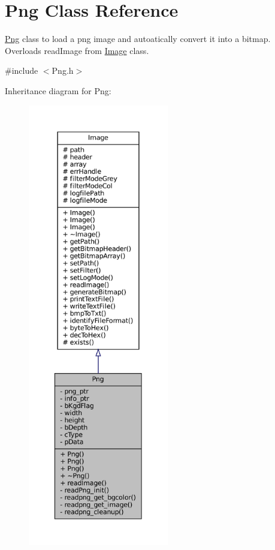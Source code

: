 \hypertarget{classPng}{}\section{Png Class Reference}
\label{classPng}


\mbox{\hyperlink{classPng}{Png}} class to load a png image and autoatically convert it into a bitmap. Overloads read\+Image from \mbox{\hyperlink{classImage}{Image}} class.  




{\ttfamily \#include $<$Png.\+h$>$}



Inheritance diagram for Png\+:\nopagebreak
\begin{figure}[H]
\begin{center}
\leavevmode
\includegraphics[height=550pt]{classPng__inherit__graph}
\end{center}
\end{figure}


